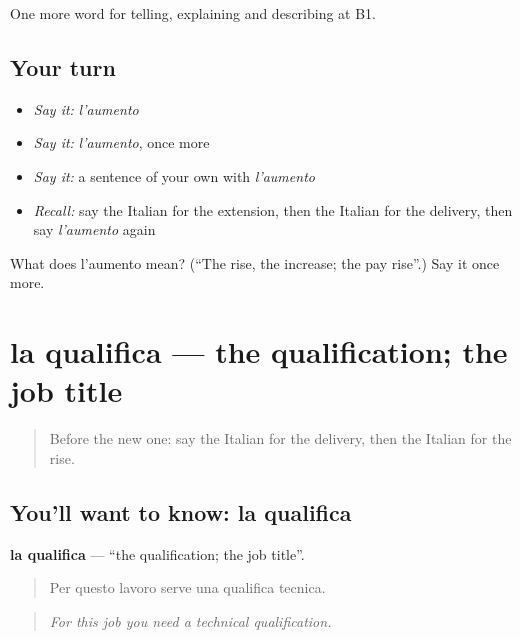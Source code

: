 \begin{grammarlens}[title={What you've built}]
One more word for telling, explaining and describing at B1.
\end{grammarlens}

\subsection*{Your turn}
\begin{itemize}
\raggedright
  \item \emph{Say it:} \emph{l'aumento}
  \item \emph{Say it:} \emph{l'aumento}, once more
  \item \emph{Say it:} a sentence of your own with \emph{l'aumento}
  \item \emph{Recall:} say the Italian for the extension, then the Italian for the delivery, then say \emph{l'aumento} again
\end{itemize}

\begin{tcolorbox}[breakable,colback=teal!4,colframe=teal!35!black,title={Before you move on}]
What does l'aumento mean? (\textquotedblleft{}The rise, the increase; the pay rise\textquotedblright{}.) Say it once more.
\end{tcolorbox}
\section[la qualifica]{la qualifica — the qualification; the job title}

\label{lesson:IT-C361-qualifica}



\begin{quote}
Before the new one: say the Italian for the delivery, then the Italian for the rise.
\end{quote}

\subsection*{You'll want to know: la qualifica}
\textbf{la qualifica} — \textquotedblleft{}the qualification; the job title\textquotedblright{}.

\begin{quote}
Per questo lavoro serve una qualifica tecnica.
\end{quote}

\begin{quote}
\emph{For this job you need a technical qualification.}
\end{quote}

